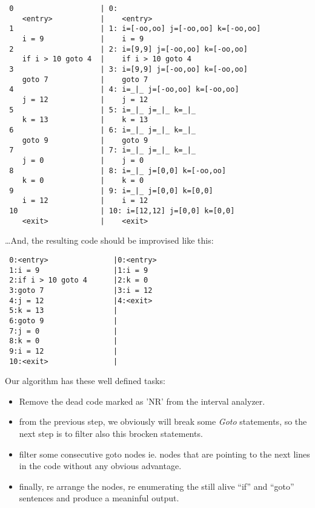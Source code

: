 \documentclass{article}
\begin{document}
\begin{verbatim}
 0                    | 0:
    <entry>           |    <entry>
 1                    | 1: i=[-oo,oo] j=[-oo,oo] k=[-oo,oo]
    i = 9             |    i = 9
 2                    | 2: i=[9,9] j=[-oo,oo] k=[-oo,oo]
    if i > 10 goto 4  |    if i > 10 goto 4
 3                    | 3: i=[9,9] j=[-oo,oo] k=[-oo,oo]
    goto 7            |    goto 7
 4                    | 4: i=_|_ j=[-oo,oo] k=[-oo,oo]
    j = 12            |    j = 12
 5                    | 5: i=_|_ j=_|_ k=_|_
    k = 13            |    k = 13
 6                    | 6: i=_|_ j=_|_ k=_|_
    goto 9            |    goto 9
 7                    | 7: i=_|_ j=_|_ k=_|_
    j = 0             |    j = 0
 8                    | 8: i=_|_ j=[0,0] k=[-oo,oo]
    k = 0             |    k = 0
 9                    | 9: i=_|_ j=[0,0] k=[0,0]
    i = 12            |    i = 12
 10                   | 10: i=[12,12] j=[0,0] k=[0,0]
    <exit>            |    <exit>

\end{verbatim}

\dots And, the resulting code should be improvised like this: 

\begin{verbatim}
 0:<entry>               |0:<entry>               
 1:i = 9                 |1:i = 9                 
 2:if i > 10 goto 4      |2:k = 0                 
 3:goto 7                |3:i = 12                
 4:j = 12                |4:<exit>                
 5:k = 13                |                        
 6:goto 9                |                        
 7:j = 0                 |                        
 8:k = 0                 |                        
 9:i = 12                |                        
 10:<exit>               |                        

\end{verbatim}

Our algorithm has these well defined tasks:

\begin{itemize}
  \item Remove the dead code marked as 'NR'  from the interval analyzer. 
  \item from the previous step, we obviously will break some \emph{Goto} statements, so the next step is to filter also this brocken statements.
  \item filter some consecutive goto nodes ie. nodes that are pointing to the next lines in the code without any obvious advantage.
  \item finally, re arrange the nodes, re enumerating the still alive ``if'' and ``goto'' sentences and produce a meaninful output.
\end{itemize}
\end{document}
